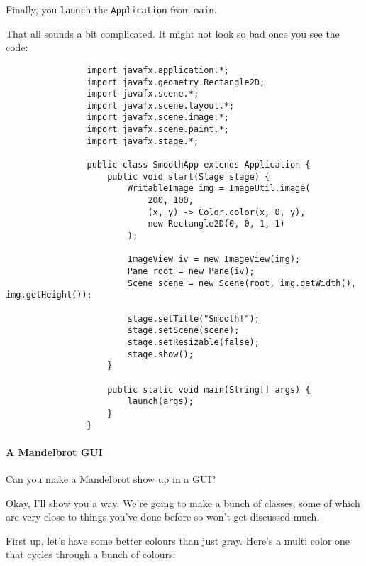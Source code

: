 \documentclass{article}
\begin{document}
            Finally, you \texttt{launch} the \texttt{Application} from \texttt{main}.
            
            That all sounds a bit complicated.  It might not look so bad once you see the code:
            
            \begin{verbatim}            
                import javafx.application.*;
                import javafx.geometry.Rectangle2D;
                import javafx.scene.*;
                import javafx.scene.layout.*;
                import javafx.scene.image.*;
                import javafx.scene.paint.*;
                import javafx.stage.*;

                public class SmoothApp extends Application {
                    public void start(Stage stage) {
                        WritableImage img = ImageUtil.image(
                            200, 100,
                            (x, y) -> Color.color(x, 0, y),
                            new Rectangle2D(0, 0, 1, 1)
                        );
        
                        ImageView iv = new ImageView(img);
                        Pane root = new Pane(iv);
                        Scene scene = new Scene(root, img.getWidth(), img.getHeight());

                        stage.setTitle("Smooth!");
                        stage.setScene(scene);
                        stage.setResizable​(false);
                        stage.show();
                    }

                    public static void main(String[] args) {
                        launch(args);
                    }
                }
            \end{verbatim}
        
        \newpage
        \paragraph{A Mandelbrot GUI}
            Can you make a Mandelbrot show up in a GUI?
            
            Okay, I'll show you a way. We're going to make a bunch of classes, some of which are very close to things you've done before so
            won't get discussed much.
            
            First up, let's have some better colours than just gray.  Here's a multi color one that cycles through a bunch of colours:
            
\end{document}
